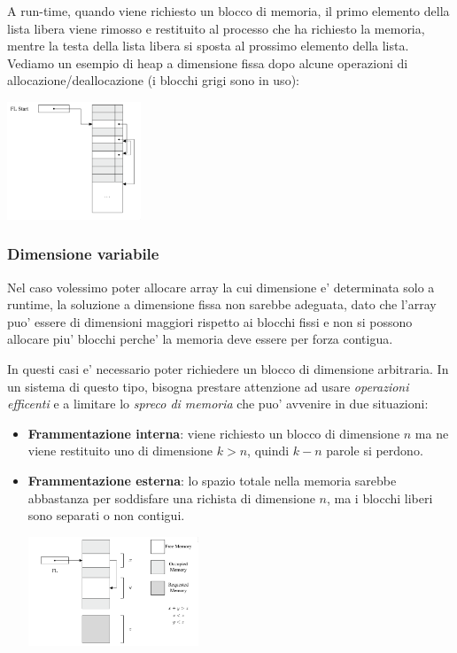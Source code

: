 A run-time, quando viene richiesto un blocco di memoria, il primo elemento della lista libera viene rimosso e restituito al processo che ha richiesto la memoria, mentre la testa della lista libera si sposta al prossimo elemento della lista. Vediamo un esempio di heap a dimensione fissa dopo alcune operazioni di allocazione/deallocazione (i blocchi grigi sono in uso):
\begin{center}
  \includegraphics[width=0.3\textwidth]{img/2025-03-02-15-32-35.png}
\end{center}

\subsubsection{Dimensione variabile}

Nel caso volessimo poter allocare array la cui dimensione e' determinata solo a runtime, la soluzione a dimensione fissa non sarebbe adeguata, dato che l'array puo' essere di dimensioni maggiori rispetto ai blocchi fissi e non si possono allocare piu' blocchi perche' la memoria deve essere per forza contigua. 

In questi casi e' necessario poter richiedere un blocco di dimensione arbitraria. In un sistema di questo tipo, bisogna prestare attenzione ad usare \textit{operazioni efficenti} e a limitare lo \textit{spreco di memoria} che puo' avvenire in due situazioni:
\begin{itemize}
\item \textbf{Frammentazione interna}: viene richiesto un blocco di dimensione $ n $ ma ne viene restituito uno di dimensione $ k > n $, quindi $ k-n $ parole si perdono.
\item \textbf{Frammentazione esterna}: lo spazio totale nella memoria sarebbe abbastanza per soddisfare una richista di dimensione $ n $, ma i blocchi liberi sono separati o non contigui.
  \begin{center}
    \includegraphics[width=0.4\textwidth]{img/2025-03-02-16-01-30.png}
  \end{center}
\end{itemize}

